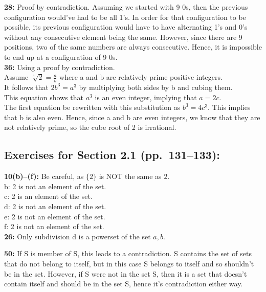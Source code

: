 \documentclass[12pt]{article}  %
\begin{document}
\noindent
{\bf 28:} Proof by contradiction. Assuming we started with 9 0s, then the previous configuration
would've had to be all 1's. In order for that configuration to be possible, its 
previous configuration would have to have alternating 1's and 0's without any 
consecutive element being the same. However, since there are 9 positions, two 
of the same numbers are always consecutive. Hence, it is impossible to end up at 
a configuration of 9 0s.
\\
\noindent
{\bf 36:}
Using a proof by contradiction.\\
Assume $\sqrt[3]{2} = \frac{a}{b}$ where a and b are relatively prime positive integers.\\
It follows that $2b^{3} = a^{3}$ by multiplying both sides by b and cubing them.\\
This equation shows that $a^{3}$ is an even integer, implying that $a = 2c$. \\
The first equation be rewritten with this substitution as $b^{3} = 4c^{3}$. This implies that b
is also even. Hence, since a and b are even integers, we know that they are not relatively
prime, so the cube root of 2 is irrational.


\subsection*{Exercises for Section 2.1 (pp.\ 131--133):}     

\noindent
{\bf 10(b)--(f):} Be careful, as $\{2\}$ is NOT the same as $2$.\\
b: 2 is not an element of the set.\\
c: 2 is an element of the set.\\
d: 2 is not an element of the set.\\
e: 2 is not an element of the set.\\
f: 2 is not an element of the set.\\

\noindent
{\bf 26:}
Only subdivision d is a powerset of the set ${a, b}$.

\noindent
{\bf 50:} If S is member of S, this leads to a contradiction. S contains the set 
of sets that do not belong to itself, but in this case S belongs to itself and so 
shouldn't be in the set. However, if S were not in the set S, then it is a set that
doesn't contain itself and should be in the set S, hence it's contradiction either
way. 
\end{document}

